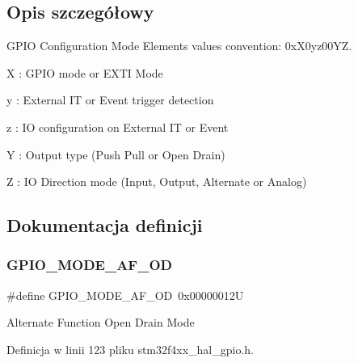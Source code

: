 \subsection{Opis szczegółowy}
G\+P\+IO Configuration Mode Elements values convention\+: 0x\+X0yz00\+YZ. 


\begin{DoxyItemize}
\item X \+: G\+P\+IO mode or E\+X\+TI Mode
\item y \+: External IT or Event trigger detection
\item z \+: IO configuration on External IT or Event
\item Y \+: Output type (Push Pull or Open Drain)
\item Z \+: IO Direction mode (Input, Output, Alternate or Analog) 
\end{DoxyItemize}

\subsection{Dokumentacja definicji}
\mbox{\label{group___g_p_i_o__mode__define_ga282b9fd37c8ef31daba314ffae6bf023}} 
\subsubsection{\texorpdfstring{G\+P\+I\+O\+\_\+\+M\+O\+D\+E\+\_\+\+A\+F\+\_\+\+OD}{GPIO\_MODE\_AF\_OD}}
{\footnotesize\ttfamily \#define G\+P\+I\+O\+\_\+\+M\+O\+D\+E\+\_\+\+A\+F\+\_\+\+OD~0x00000012U}

Alternate Function Open Drain Mode 

Definicja w linii 123 pliku stm32f4xx\+\_\+hal\+\_\+gpio.\+h.

\mbox{\label{group___g_p_i_o__mode__define_ga526c72c5264316fc05c775b6cad4aa6a}} 
